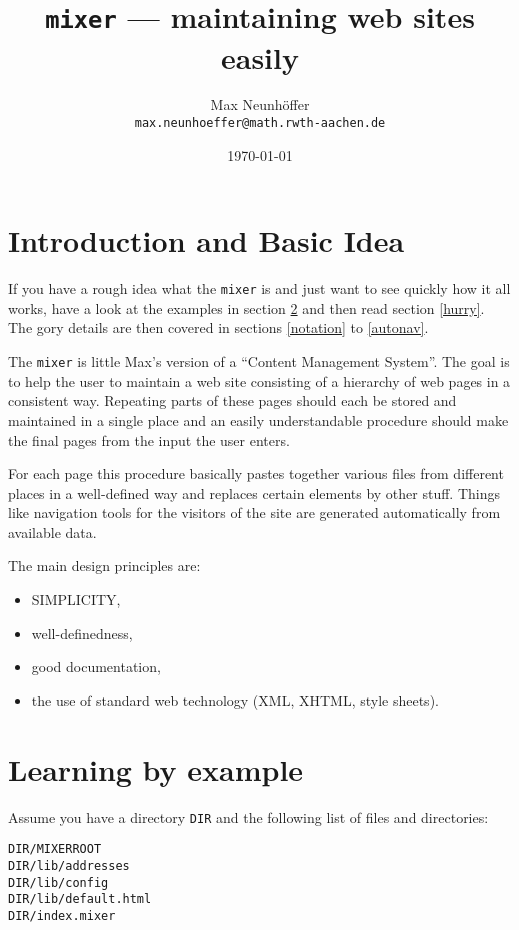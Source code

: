 \documentclass[a4paper,11pt]{article}
\newcommand{\mixer}{\texttt{mixer}}
\begin{document}
\title{{\mixer} --- maintaining web sites easily}
\author{Max Neunhöffer \\ \texttt{max.neunhoeffer@math.rwth-aachen.de}}
\date{\today}
\maketitle

\tableofcontents

\section{Introduction and Basic Idea}

If you have a rough idea what the {\mixer} is and just want to see quickly
how it all works, have a look at the examples in section \ref{examples}
and then read section \ref{hurry}. The gory details are then covered in
sections \ref{notation} to \ref{autonav}.

The {\mixer} is little Max's version of a "`Content Management System"'.
The goal is to help the user to maintain a web site consisting of
a hierarchy of web pages in a consistent way. Repeating parts of
these pages should each be stored and maintained in a single place
and an easily understandable procedure should make the final pages
from the input the user enters.

For each page this procedure basically pastes together various files
from different places in a well-defined way and replaces certain
elements by other stuff. Things like navigation tools for the visitors
of the site are generated automatically from available data.

The main design principles are:
\begin{itemize}
\setlength{\parsep}{0mm}
 \item SIMPLICITY,
 \item well-definedness,
 \item good documentation,
 \item the use of standard web technology (XML, XHTML, style sheets).
\end{itemize}

\section{Learning by example}
\label{examples}

Assume you have a directory \verb!DIR! and the following list of files
and directories:

\begin{verbatim}
DIR/MIXERROOT
DIR/lib/addresses
DIR/lib/config
DIR/lib/default.html
DIR/index.mixer
\end{verbatim}
\end{document}
